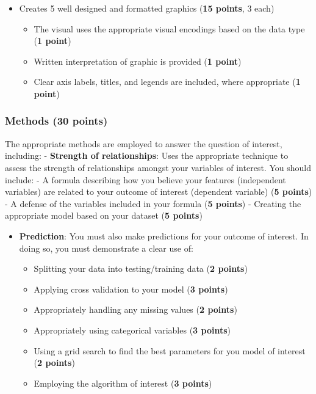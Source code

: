 \documentclass[
]{article}
\providecommand{\tightlist}{%
  \setlength{\itemsep}{0pt}\setlength{\parskip}{0pt}}
\begin{document}
\begin{itemize}
\tightlist
\item
  Creates 5 well designed and formatted graphics (\textbf{15 points}, 3
  each)

  \begin{itemize}
  \tightlist
  \item
    The visual uses the appropriate visual encodings based on the data
    type (\textbf{1 point})
  \item
    Written interpretation of graphic is provided (\textbf{1 point})
  \item
    Clear axis labels, titles, and legends are included, where
    appropriate (\textbf{1 point})
  \end{itemize}
\end{itemize}

\hypertarget{methods-30-points}{%
\subsubsection{\texorpdfstring{Methods (\textbf{30
points})}{Methods (30 points)}}\label{methods-30-points}}

The appropriate methods are employed to answer the question of interest,
including: - \textbf{Strength of relationships}: Uses the appropriate
technique to assess the strength of relationships amongst your variables
of interest. You should include: - A formula describing how you believe
your features (independent variables) are related to your outcome of
interest (dependent variable) (\textbf{5 points}) - A defense of the
variables included in your formula (\textbf{5 points}) - Creating the
appropriate model based on your dataset (\textbf{5 points})

\begin{itemize}
\tightlist
\item
  \textbf{Prediction}: You must also make predictions for your outcome
  of interest. In doing so, you must demonstrate a clear use of:

  \begin{itemize}
  \tightlist
  \item
    Splitting your data into testing/training data (\textbf{2 points})
  \item
    Applying cross validation to your model (\textbf{3 points})
  \item
    Appropriately handling any missing values (\textbf{2 points})
  \item
    Appropriately using categorical variables (\textbf{3 points})
  \item
    Using a grid search to find the best parameters for you model of
    interest (\textbf{2 points})
  \item
    Employing the algorithm of interest (\textbf{3 points})
  \end{itemize}
\end{itemize}
\end{document}
